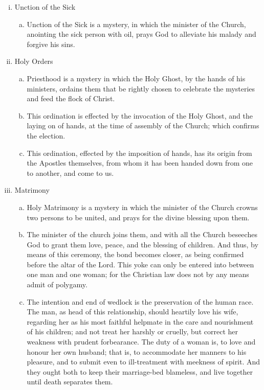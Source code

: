 \begin{enumerate}
\begin{enumerate}[i.]
\begin{enumerate}[a.]
			\end{enumerate}
		\item Unction of the Sick
			\begin{enumerate}[a.]
				\item Unction of the Sick is a mystery, in which the minister of the Church, anointing the sick person with oil, prays God to alleviate his malady and forgive his sins.
			\end{enumerate}
		\item Holy Orders
			\begin{enumerate}[a.]
				\item Priesthood is a mystery in which the Holy Ghost, by the hands of his ministers, ordains them that be rightly chosen to celebrate the mysteries and feed the flock of Christ.
				\item This ordination is effected by the invocation of the Holy Ghost, and the laying on of hands, at the time of assembly of the Church; which confirms the election.
				\item This ordination, effected by the imposition of hands, has its origin from the Apostles themselves, from whom it has been handed down from one to another, and come to us.
			\end{enumerate}
		\item Matrimony
			\begin{enumerate}[a.]
				\item Holy Matrimony is a mystery in which the minister of the Church crowns two persons to be united, and prays for the divine blessing upon them.
				\item The minister of the church joins them, and with all the Church beseeches God to grant them love, peace, and the blessing of children. And thus, by means of this ceremony, the bond becomes closer, as being confirmed before the altar of the Lord. This yoke can only be entered into between one man and one woman; for the Christian law does not by any means admit of polygamy.
				\item The intention and end of wedlock is the preservation of the human race. The man, as head of this relationship, should heartily love his wife, regarding her as his most faithful helpmate in the care and nourishment of his children; and not treat her harshly or cruelly, but correct her weakness with prudent forbearance. The duty of a woman is, to love and honour her own husband; that is, to accommodate her manners to his pleasure, and to submit even to ill-treatment with meekness of spirit. And they ought both to keep their marriage-bed blameless, and live together until death separates them.

\end{enumerate}
\end{enumerate}
\end{enumerate}
